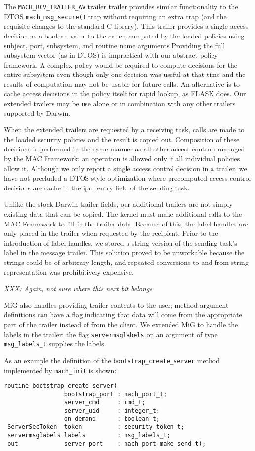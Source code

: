 The {\tt MACH\_RCV\_TRAILER\_AV} trailer trailer provides similar
functionality to the DTOS {\tt mach\_msg\_secure()} trap without
requiring an extra trap (and the requisite changes to the standard
C library).  This trailer provides a single access decision as a
boolean value to the caller, computed by the loaded policies using
subject, port, subsystem, and routine name arguments  Providing the
full subsystem vector (as in DTOS) is impractical with our abstract
policy framework.  A complex policy would be required to compute
decisions for the entire subsystem even though only one decision
was useful at that time and the results of computation may not be
usable for future calls.  An alternative is to cache access decisions
in the policy itself for rapid lookup, as FLASK does.  Our extended
trailers may be use alone or in combination with any other trailers
supported by Darwin.

When the extended trailers are requested by a receiving task, calls
are made to the loaded security policies and the result is copied
out. Composition of these decisions is performed in the same manner
as all other access controls managed by the MAC Framework: an
operation is allowed only if all individual policies allow it.
Although we only report a single access control decision in a
trailer, we have not precluded a DTOS-style optimization where
precomputed access control decisions are cache in the ipc\_entry
field of the sending task.

Unlike the stock Darwin trailer fields, our additional trailers are
not simply existing data that can be copied.  The kernel must make
additional calls to the MAC Framework to fill in the trailer data.
Because of this, the label handles are only placed in the trailer
when requested by the recipient. Prior to the introduction of label
handles, we stored a string version of the sending task's label in
the message trailer.  This solution proved to be unworkable because
the strings could be of arbitrary length, and repeated conversions
to and from string representation was prohibitively expensive.

\textit{XXX: Again, not sure where this next bit belongs}

MiG also handles providing trailer contents to the user; method argument definitions can
have a flag indicating that data will come from the appropriate part of the trailer instead
of from the client. We extended MiG to handle the labels in the trailer; the flag
{\tt servermsglabels} on an argument of type {\tt msg\_labels\_t} supplies the labels.
\begin{samepage}
As an example the definition of the {\tt bootstrap\_create\_server} method implemented by
{\tt mach\_init} is shown:
\begin{verbatim}
routine bootstrap_create_server(
                 bootstrap_port : mach_port_t;
                 server_cmd     : cmd_t;
                 server_uid     : integer_t;
                 on_demand      : boolean_t;
 ServerSecToken  token          : security_token_t;
 servermsglabels labels         : msg_labels_t;
 out             server_port    : mach_port_make_send_t);
\end{verbatim}
\end{samepage}

